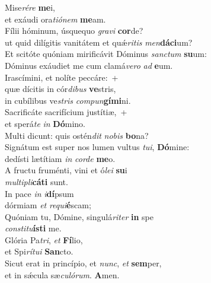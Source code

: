 \evenverse Mise\textit{ré}\textit{re} \textbf{me}i,~\*\\
\evenverse et exáudi ora\textit{ti}\textit{ó}\textit{nem} \textbf{me}am.\\
\oddverse Fílii hóminum, úsquequo \textit{gra}\textit{vi} \textbf{cor}de?~\*\\
\oddverse ut quid dilígitis vanitátem et quǽ\textit{ri}\textit{tis} \textit{men}\textbf{dá}\textbf{ci}um?\\
\evenverse Et scitóte quóniam mirificávit Dóminus \textit{san}\textit{ctum} \textbf{su}um:~\*\\
\evenverse Dóminus exáudiet me cum clamá\textit{ve}\textit{ro} \textit{ad} \textbf{e}um.\\
\oddverse Irascímini, et nolíte peccáre:~+\\
\oddverse  quæ dícitis in cór\textit{di}\textit{bus} \textbf{ve}stris,~\*\\
\oddverse in cubílibus ve\textit{stris} \textit{com}\textit{pun}\textbf{gí}\textbf{mi}ni.\\
\evenverse Sacrificáte sacrifícium justítiæ,~+\\
\evenverse  et sperá\textit{te} \textit{in} \textbf{Dó}mino.~\*\\
\evenverse Multi dicunt: quis ostén\textit{dit} \textit{no}\textit{bis} \textbf{bo}na?\\
\oddverse Signátum est super nos lumen vultus \textit{tu}\textit{i}, \textbf{Dó}mine:~\*\\
\oddverse dedísti lætítiam \textit{in} \textit{cor}\textit{de} \textbf{me}o.\\
\evenverse A fructu fruménti, vini et ó\textit{le}\textit{i} \textbf{su}i~\*\\
\evenverse \textit{mul}\textit{ti}\textit{pli}\textbf{cá}\textbf{ti} sunt.\\
\oddverse In pace \textit{in} \textit{i}\textbf{dí}psum~\*\\
\oddverse dórmiam \textit{et} \textit{re}\textit{qui}\textbf{é}scam;\\
\evenverse Quóniam tu, Dómine, singulá\textit{ri}\textit{ter} \textbf{in} spe~\*\\
\evenverse \textit{con}\textit{sti}\textit{tu}\textbf{í}\textbf{sti} me.\\
\oddverse Glória Pa\textit{tri}, \textit{et} \textbf{Fí}lio,~\*\\
\oddverse et Spi\textit{rí}\textit{tu}\textit{i} \textbf{San}cto.\\
\evenverse Sicut erat in princípio, et \textit{nunc}, \textit{et} \textbf{sem}per,~\*\\
\evenverse et in sǽcula sæ\textit{cu}\textit{ló}\textit{rum}. \textbf{A}men.\\
